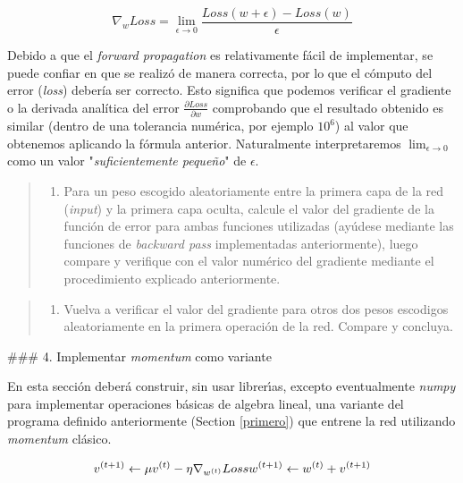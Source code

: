 \documentclass[11pt]{article}
\providecommand{\tightlist}{%
      \setlength{\itemsep}{0pt}\setlength{\parskip}{0pt}}
\begin{document}
\[ \nabla_{w} Loss = \lim_{\epsilon \rightarrow 0} \frac{Loss(w+ \epsilon)-Loss(w)}{\epsilon} \]

Debido a que el \emph{forward propagation} es relativamente fácil de
implementar, se puede confiar en que se realizó de manera correcta, por
lo que el cómputo del error (\emph{loss}) debería ser correcto. Esto
significa que podemos verificar el gradiente o la derivada analítica del
error \(\frac{\partial Loss}{\partial w}\) comprobando que el resultado
obtenido es similar (dentro de una tolerancia numérica, por ejemplo
\(10^6\)) al valor que obtenemos aplicando la fórmula anterior.
Naturalmente interpretaremos \(\lim_{\epsilon \rightarrow 0}\) como un
valor "\emph{suficientemente pequeño}" de \(\epsilon\).

\begin{quote}
\begin{enumerate}
\def\labelenumi{\alph{enumi})}
\tightlist
\item
  Para un peso escogido aleatoriamente entre la primera capa de la red
  (\emph{input}) y la primera capa oculta, calcule el valor del
  gradiente de la función de error para ambas funciones utilizadas
  (ayúdese mediante las funciones de \emph{backward pass} implementadas
  anteriormente), luego compare y verifique con el valor numérico del
  gradiente mediante el procedimiento explicado anteriormente.
\end{enumerate}
\end{quote}

\begin{quote}
\begin{enumerate}
\def\labelenumi{\alph{enumi})}
\setcounter{enumi}{1}
\tightlist
\item
  Vuelva a verificar el valor del gradiente para otros dos pesos
  escodigos aleatoriamente en la primera operación de la red. Compare y
  concluya.
\end{enumerate}
\end{quote}

     \#\#\# 4. Implementar \emph{momentum} como variante

En esta sección deberá construir, sin usar librerı́as, excepto
eventualmente \emph{numpy} para implementar operaciones básicas de
algebra lineal, una variante del programa definido anteriormente
(Section \ref{primero}) que entrene la red utilizando \emph{momentum}
clásico.

\[ v^{(t+1)} \leftarrow \mu v^{(t)} - \eta \nabla_{w^{(t)}} Loss \\
w^{(t+1)} \leftarrow w^{(t)} + v^{(t+1)}
\]
\end{document}
